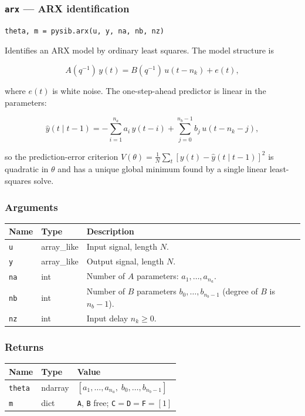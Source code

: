 \documentclass[../main]{subfiles}
\begin{document}
\newpage

\subsubsection{\texttt{arx} --- ARX identification}

\begin{lstlisting}
theta, m = pysib.arx(u, y, na, nb, nz)
\end{lstlisting}

Identifies an ARX model by ordinary least squares.
The model structure is

\[
  A(q^{-1})\,y(t) = B(q^{-1})\,u(t - n_k) + e(t),
\]

where $e(t)$ is white noise.
The one-step-ahead predictor is linear in the parameters:

\[
  \hat{y}(t \mid t-1) =
  -\sum_{i=1}^{n_a} a_i\,y(t-i)
  + \sum_{j=0}^{n_b-1} b_j\,u(t - n_k - j),
\]

so the prediction-error criterion
$V(\theta) = \tfrac{1}{N}\sum_t [y(t) - \hat{y}(t\mid t-1)]^2$
is quadratic in $\theta$ and has a unique global minimum found
by a single linear least-squares solve.

\subsubsection*{Arguments}
\begin{center}
\begin{tabular}{lll}
  \toprule
  Name & Type & Description \\
  \midrule
  \texttt{u}  & array\_like & Input signal, length $N$. \\
  \texttt{y}  & array\_like & Output signal, length $N$. \\
  \texttt{na} & int & Number of $A$ parameters: $a_1,\ldots,a_{n_a}$. \\
  \texttt{nb} & int & Number of $B$ parameters $b_0,\ldots,b_{n_b-1}$ (degree of $B$ is $n_b-1$). \\
  \texttt{nz} & int & Input delay $n_k \geq 0$. \\
  \bottomrule
\end{tabular}
\end{center}

\subsubsection*{Returns}
\begin{center}
\begin{tabular}{lll}
  \toprule
  Name & Type & Value \\
  \midrule
  \texttt{theta} & ndarray & $[a_1,\ldots,a_{n_a},\; b_0,\ldots,b_{n_b-1}]$ \\
  \texttt{m}     & dict    & \texttt{A}, \texttt{B} free; \texttt{C}$=$\texttt{D}$=$\texttt{F}$=[1]$ \\
  \bottomrule
\end{tabular}
\end{center}
\end{document}
